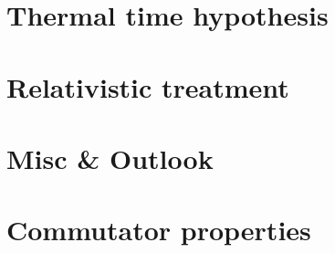 \iftodo
\chapter{Thermal time hypothesis}

\fi

\chapter{Relativistic treatment}


\iftodo
\chapter{Misc \& Outlook}

\fi

\appendix
\chapter{Commutator properties}


\printbibliography[heading=bibintoc]


